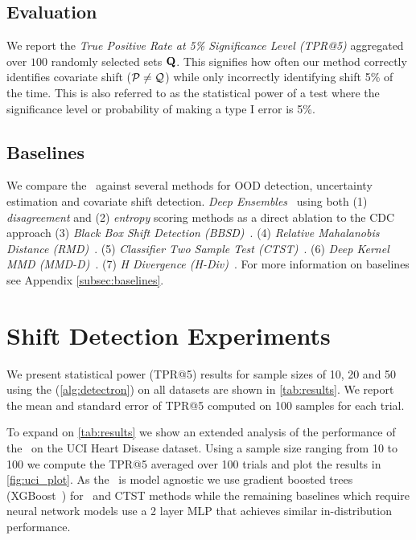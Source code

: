 \subsection{Evaluation} We report the \textit{True Positive Rate at 5\% Significance Level (TPR@5)} aggregated over $100$ randomly selected sets $\mathbf{Q}$.
This signifies how often our method correctly identifies covariate shift ($\mathcal{P}\neq\mathcal{Q}$) while only incorrectly identifying shift 5\% of the time.
This is also referred to as the statistical power of a test where the significance level or probability of making a type I error is 5\%.

\subsection{Baselines} We compare the \method\ against several methods for OOD detection, uncertainty estimation and covariate shift detection. \textit{Deep Ensembles}~\cite{trustuncert} using both (1) \textit{disagreement} and (2) \textit{entropy} scoring methods as a direct ablation to the CDC approach (3) \textit{Black Box Shift Detection (BBSD)}~\citep{bbsd}.
(4) \textit{Relative Mahalanobis Distance (RMD)}~\citep{relmahala}.
(5) \textit{Classifier Two Sample Test (CTST)}~\citep{paz2017revisiting}.
(6) \textit{Deep Kernel MMD (MMD-D)}~\citep{liu2020learning}.
(7) \textit{H Divergence (H-Div)}~\citep{zhao2022comparing}.
For more information on baselines see Appendix \autoref{subsec:baselines}.


\section{Shift Detection Experiments}
We present statistical power (TPR@5) results for sample sizes of 10, 20 and 50 using the \method (\autoref{alg:detectron})
on all datasets are shown in \autoref{tab:results}.
We report the mean and standard error of TPR@5 computed on 100 samples for each trial.



To expand on \autoref{tab:results} we show an extended analysis of the performance of the \method\ on the UCI Heart Disease dataset.
Using a sample size ranging from 10 to 100 we compute the TPR@5 averaged over 100 trials and plot the results in \autoref{fig:uci_plot}.
As the \method\ is model agnostic we use gradient boosted trees (XGBoost~\citep{xgb}) for \method\ and CTST
methods while the remaining baselines which require neural network models use a 2 layer MLP that achieves similar in-distribution performance.

